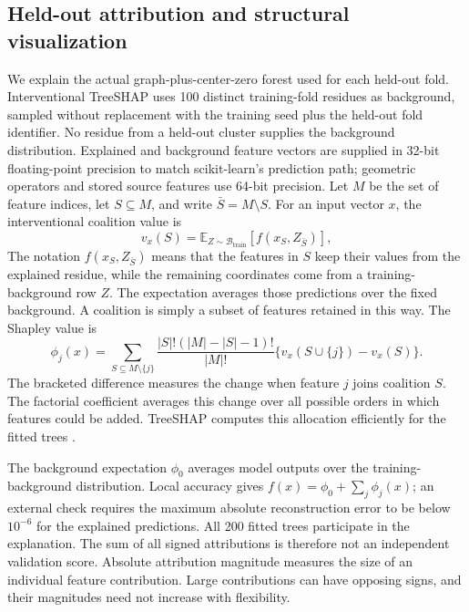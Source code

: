 \documentclass[11pt]{article}
\begin{document}
\subsection{Held-out attribution and structural visualization}
We explain the actual graph-plus-center-zero forest used for each held-out fold. Interventional TreeSHAP uses 100 distinct training-fold residues as background, sampled without replacement with the training seed plus the held-out fold identifier. No residue from a held-out cluster supplies the background distribution. Explained and background feature vectors are supplied in 32-bit floating-point precision to match scikit-learn's prediction path; geometric operators and stored source features use 64-bit precision. Let $M$ be the set of feature indices, let $S\subseteq M$, and write $\bar S=M\setminus S$. For an input vector $x$, the interventional coalition value is
\begin{equation}
v_x(S)=\mathbb E_{Z\sim\mathcal B_{\mathrm{train}}}[f(x_S,Z_{\bar S})],
\label{eq:shap-game}
\end{equation}
The notation $f(x_S,Z_{\bar S})$ means that the features in $S$ keep their values from the explained residue, while the remaining coordinates come from a training-background row $Z$. The expectation averages those predictions over the fixed background. A coalition is simply a subset of features retained in this way. The Shapley value is
\begin{equation}
\phi_j(x)=\sum_{S\subseteq M\setminus\{j\}}
\frac{|S|!(|M|-|S|-1)!}{|M|!}
\{v_x(S\cup\{j\})-v_x(S)\}.
\label{eq:shap}
\end{equation}
The bracketed difference measures the change when feature $j$ joins coalition $S$. The factorial coefficient averages this change over all possible orders in which features could be added. TreeSHAP computes this allocation efficiently for the fitted trees \citep{lundberg2017,lundberg2020}.

The background expectation $\phi_0$ averages model outputs over the training-background distribution. Local accuracy gives $f(x)=\phi_0+\sum_j\phi_j(x)$; an external check requires the maximum absolute reconstruction error to be below $10^{-6}$ for the explained predictions. All 200 fitted trees participate in the explanation. The sum of all signed attributions is therefore not an independent validation score. Absolute attribution magnitude measures the size of an individual feature contribution. Large contributions can have opposing signs, and their magnitudes need not increase with flexibility.
\end{document}
